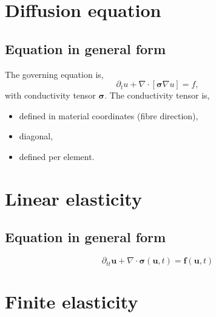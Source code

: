 \documentclass[
10pt, %
a4paper, %
oneside, %
headinclude,footinclude, %
BCOR5mm, %
]{scrartcl}
\begin{document}
\section{Diffusion equation}
%
\subsection{Equation in general form}
%
The governing equation is,
%
\begin{equation}
    \partial_t u + \nabla \cdot [\boldsymbol{\sigma} \nabla u] = f,
\end{equation}
%
with conductivity tensor $\boldsymbol{\sigma}$. The conductivity tensor is,
%
\begin{itemize}
    \item{defined in material coordinates (fibre direction),}
    \item{diagonal,}
    \item{defined per element.}
\end{itemize}
%

%

%

%

%

%
%
%

%

%
%
\clearpage
%
\section{Linear elasticity}
%
\subsection{Equation in general form}
%
\begin{equation}
    \partial_{tt} \boldsymbol{u} + \nabla \cdot \boldsymbol{\sigma} (\boldsymbol{u}, t) = \boldsymbol{f} (\boldsymbol{u}, t)
\end{equation}
%

%

%

%

%
\clearpage
%
\section{Finite elasticity}
%
%
%
%
\clearpage
%
\end{document}
